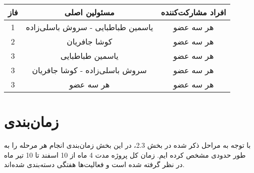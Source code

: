 \begin{table}[ht]
	\begin{center}
		\begin{tabular}{|c|c|c|}
			\hline
			فاز & مسئولین اصلی & افراد مشارکت‌کننده\\
			\hline
			\hline
			1 & یاسمین طباطبایی - سروش باسلی‌زاده & هر سه عضو \\
			\hline
			2 & کوشا جافریان & هر سه عضو \\
			\hline
			3 & یاسمین طباطبایی  & هر سه عضو \\
			\hline
			3 & سروش باسلی‌زاده - کوشا جافریان  & هر سه عضو \\
			\hline
			3 & هر سه عضو  & هر سه عضو \\
			\hline
		\end{tabular}
	\end{center}	
\end{table}

\section{زمان‌بندی}
با توجه به مراحل ذکر شده در بخش 2.3، در این بخش زمان‌بندی انجام هر مرحله را به طور حدودی مشخص کرده ایم.  زمان کل پروژه مدت 4 ماه از 10 اسفند تا 10 تیر ماه در نظر گرفته شده است و فعالیت‌ها هفتگی دسته‌بندی شده‌اند. 

